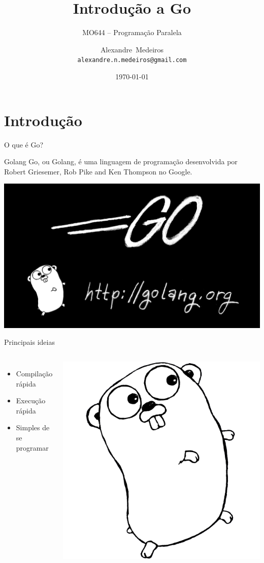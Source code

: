 \documentclass{beamer}
\title[Golang]{Introdução a Go}
\subtitle{MO644 -- Programação Paralela}
\author[Alexandre Medeiros]{Alexandre~Medeiros\\{\footnotesize\tt alexandre.n.medeiros@gmail.com}}
\institute[Unicamp]
{
    Instituto de Computação\\
    Universidade Estadual de Campinas\\
}
\date[2014s1]{\today}
\begin{document}
\frame{\titlepage}

\section{Introdução}
\begin{frame}
    {O que é Go?}
    \begin{block}{Golang}
        Go, ou Golang, é uma linguagem de programação desenvolvida por Robert
        Griesemer, Rob Pike and Ken Thompson no Google.
    \end{block}

    \vspace{10pt}
    \centering
    \includegraphics[width=.5\textwidth]{bumper.png}
\end{frame}

\begin{frame}
    {Principais ideias}
    \begin{columns}[c]
        \begin{itemize}[<+->]
            \item Compilação rápida
            \item Execução rápida
            \item Simples de se programar
        \end{itemize}

        \centering
        \includegraphics[width=.6\textwidth]{gopherbw.png}
    \end{columns}
\end{frame}
\end{document}
